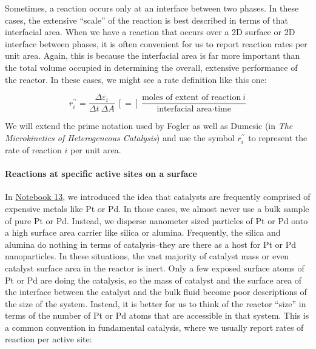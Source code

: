 \documentclass[11pt]{article}
\begin{document}
Sometimes, a reaction occurs only at an interface between two phases. In
these cases, the extensive ``scale'' of the reaction is best described
in terms of that interfacial area. When we have a reaction that occurs
over a 2D surface or 2D interface between phases, it is often convenient
for us to report reaction rates per unit area. Again, this is because
the interfacial area is far more important than the total volume
occupied in determining the overall, extensive performance of the
reactor. In these cases, we might see a rate definition like this one:

\[r_i^{\prime\prime} = \frac{\Delta \varepsilon_i}{\Delta t \ \Delta A} \ [=] \ \frac{\text{moles of extent of reaction} \ i}{\text{interfacial area} \cdot \text{time}}\]

We will extend the prime notation used by Fogler as well as Dumesic (in
\emph{The Microkinetics of Heterogeneous Catalysis}) and use the symbol
\(r_i^{\prime\prime}\) to represent the rate of reaction \(i\) per unit
area.

\hypertarget{reactions-at-specific-active-sites-on-a-surface}{%
\paragraph{Reactions at specific active sites on a
surface}\label{reactions-at-specific-active-sites-on-a-surface}}

In
\href{https://jqbond.github.io/CEN587/Notebooks/587-N13.html\#heterogenous-reactions-at-exposed-surface-atoms-active-sites}{Notebook
13}, we introduced the idea that catalysts are frequently comprised of
expensive metals like Pt or Pd. In those cases, we almost never use a
bulk sample of pure Pt or Pd. Instead, we disperse nanometer sized
particles of Pt or Pd onto a high surface area carrier like silica or
alumina. Frequently, the silica and alumina do nothing in terms of
catalysis--they are there as a host for Pt or Pd nanoparticles. In these
situations, the vast majority of catalyst mass or even catalyst surface
area in the reactor is inert. Only a few exposed surface atoms of Pt or
Pd are doing the catalysis, so the mass of catalyst and the surface area
of the interface between the catalyst and the bulk fluid become poor
descriptions of the size of the system. Instead, it is better for us to
think of the reactor ``size'' in terms of the number of Pt or Pd atoms
that are accessible in that system. This is a common convention in
fundamental catalysis, where we usually report rates of reaction per
active site:
\end{document}
